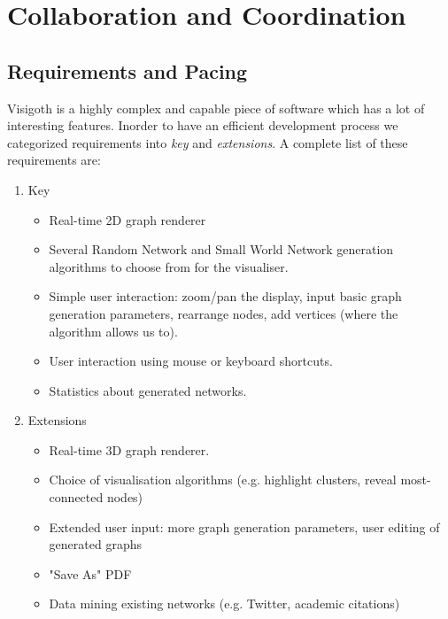 \documentclass[a4paper,11pt,titlepage]{article}
\let\stdsection\section         %
\renewcommand{\section}{\newpage\stdsection}
\newcommand{\buzz}[1]{\emph{#1}}
\begin{document}
\section{Collaboration and Coordination}

\subsection{Requirements and Pacing}

Visigoth is a highly complex and capable piece of software which has a lot of
interesting features. Inorder to have an efficient development process we
categorized requirements into \buzz{key} and \buzz{extensions}. A complete
list of these requirements are:

\begin{enumerate}

	\item Key
	\begin{itemize}
		\item	Real-time 2D graph renderer
		\item Several Random Network and Small World Network generation algorithms to
				choose from for the visualiser.
		\item Simple user interaction: zoom/pan the display, input basic graph
		generation parameters, rearrange nodes, add vertices (where the algorithm allows
		us to).
		\item User interaction using mouse or keyboard shortcuts.
		\item Statistics about generated networks.
	\end{itemize}

	\item Extensions
	\begin{itemize}
		\item Real-time 3D graph renderer.
		\item Choice of visualisation algorithms (e.g. highlight clusters, reveal most-connected nodes)
		\item Extended user input: more graph generation parameters, user editing of generated graphs
		\item "Save As" PDF
		\item Data mining existing networks (e.g. Twitter, academic citations)	

	\end{itemize}
\end{enumerate}
\end{document}
